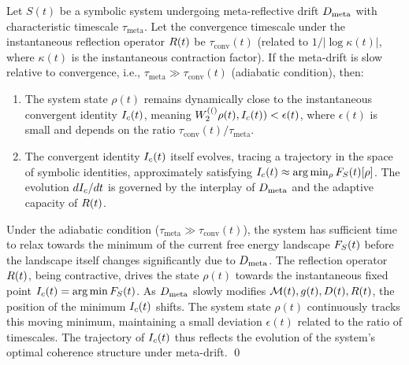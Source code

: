 \begin{theorem}
\label{theorem:bk7_relative_convergence_under_meta_drift}
Let \(S(t)\) be a symbolic system undergoing meta-reflective drift \(D_{\mathrm{meta}}\) with characteristic timescale \(\tau_{\mathrm{meta}}\). Let the convergence timescale under the instantaneous reflection operator \(R(t)\) be \(\tau_{\mathrm{conv}}(t)\) (related to \(1/|\log \kappa(t)|\), where \(\kappa(t)\) is the instantaneous contraction factor). If the meta-drift is slow relative to convergence, i.e., \(\tau_{\mathrm{meta}} \gg \tau_{\mathrm{conv}}(t)\) (adiabatic condition), then:
\begin{enumerate}
    \item The system state \(\rho(t)\) remains dynamically close to the instantaneous convergent identity \(I_c(t)\), meaning \(W_2^{(()}\rho(t), I_c(t)) < \epsilon(t)\), where \(\epsilon(t)\) is small and depends on the ratio \(\tau_{\mathrm{conv}}(t) / \tau_{\mathrm{meta}}\).
    \item The convergent identity \(I_c(t)\) itself evolves, tracing a trajectory in the space of symbolic identities, approximately satisfying \(I_c(t) \approx \arg\min_{\rho} F_S(t)[\rho]\). The evolution \(dI_c/dt\) is governed by the interplay of \(D_{\mathrm{meta}}\) and the adaptive capacity of \(R(t)\).
\end{enumerate}
\end{theorem}
\begin{demonstratio}
\label{demonstratio:bk7_adiabatic_tracking_reflective_minima}
Under the adiabatic condition (\(\tau_{\mathrm{meta}} \gg \tau_{\mathrm{conv}}(t)\)), the system has sufficient time to relax towards the minimum of the current free energy landscape \(F_S(t)\) before the landscape itself changes significantly due to \(D_{\mathrm{meta}}\). The reflection operator \(R(t)\), being contractive, drives the state \(\rho(t)\) towards the instantaneous fixed point \(I_c(t) = \arg\min F_S(t)\). As \(D_{\mathrm{meta}}\) slowly modifies \(\mathcal{M}(t), g(t), D(t), R(t)\), the position of the minimum \(I_c(t)\) shifts. The system state \(\rho(t)\) continuously tracks this moving minimum, maintaining a small deviation \(\epsilon(t)\) related to the ratio of timescales. The trajectory of \(I_c(t)\) thus reflects the evolution of the system's optimal coherence structure under meta-drift. \qed
\end{demonstratio}

